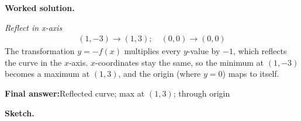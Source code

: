 \documentclass[11pt]{article}
\begin{document}
\textbf{Worked solution.}

\textit{Reflect in x-axis}
\[\begin{gathered}
(1, -3) \to (1, 3); \quad (0, 0) \to (0, 0)
\end{gathered}\]
The transformation \( y = -f(x) \) multiplies every \( y \)-value by \(-1\), which reflects the curve in the \( x \)-axis. \( x \)-coordinates stay the same, so the minimum at \( (1, -3) \) becomes a maximum at \( (1, 3) \), and the origin (where \( y = 0 \)) maps to itself.

\begin{answerbox}
\textbf{Final answer:}\quad Reflected curve; max at \(\displaystyle (1,3)\); through origin
\end{answerbox}
\textbf{Sketch.}

\begin{center}
\end{center}
\end{document}
